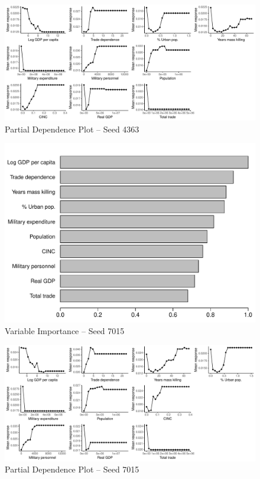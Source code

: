 \newpage

\clearpage
\begin{figure}
    \includegraphics[width=\textheight]{images/rf-mk-4363-pd.pdf}
    \caption{Partial Dependence Plot -- Seed 4363}
    \label{fig:rf-mk-4363}
\end{figure}
\clearpage

\newpage


\begin{figure}
    \includegraphics[width=.85\textwidth]{images/rf-mk-7015.pdf}
    \caption{Variable Importance -- Seed 7015}
    \label{fig:rf-mk-4363}
\end{figure}

\newpage

\clearpage
\begin{figure}
    \centering
    \includegraphics[width=\textwidth]{images/rf-mk-7015-pd.pdf}
    \caption{Partial Dependence Plot -- Seed 7015}
    \label{fig:rf-mk-4363}
\end{figure}

